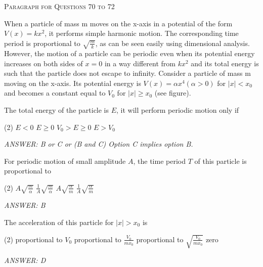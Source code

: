 \begin{center}
    \textsc{Paragraph for Questions 70 to 72}
\end{center}

When a particle of mass m moves on the x-axis in a potential of the form $V(x) = kx^2$, it performs simple harmonic motion. The corresponding time period is proportional to $\sqrt{\frac{m}{k}}$, as can be seen easily using dimensional analysis. However, the motion of a particle can be periodic even when its potential energy increases on both sides of $x = 0$ in a way different from $kx^2$ and its total energy is such that the particle does not escape to infinity. Consider a particle of mass m moving on the x-axis. Its potential energy is $V(x) = \alpha x^4 (\alpha > 0)$ for $|x| < x_0$ and becomes a constant equal to $V_0$ for $|x| \geq x_0$ (see figure).

\begin{center}
\end{center}

\item The total energy of the particle is $E$, it will perform periodic motion only if
    \begin{tasks}(2)
        \task $E < 0$
        \task $E \geq 0$\ans
        \task $V_0 > E \geq 0$\ans
        \task $E > V_0$
    \end{tasks}
    \textit{ANSWER: B or C or (B and C) Option C implies option B.}

\item For periodic motion of small amplitude $A$, the time period $T$ of this particle is proportional to
    \begin{tasks}(2)
        \task $A\sqrt{\frac{m}{\alpha}}$
        \task $\frac{1}{A}\sqrt{\frac{m}{\alpha}}$\ans
        \task $A\sqrt{\frac{\alpha}{m}}$
        \task $\frac{1}{A}\sqrt{\frac{\alpha}{m}}$
    \end{tasks}
    \textit{ANSWER: B}

\item The acceleration of this particle for $|x| > x_0$ is
    \begin{tasks}(2)
        \task proportional to $V_0$
        \task proportional to $\frac{V_0}{m x_0}$
        \task proportional to $\sqrt{\frac{V_0}{m x_0}}$
        \task zero\ans
    \end{tasks}
    \textit{ANSWER: D}